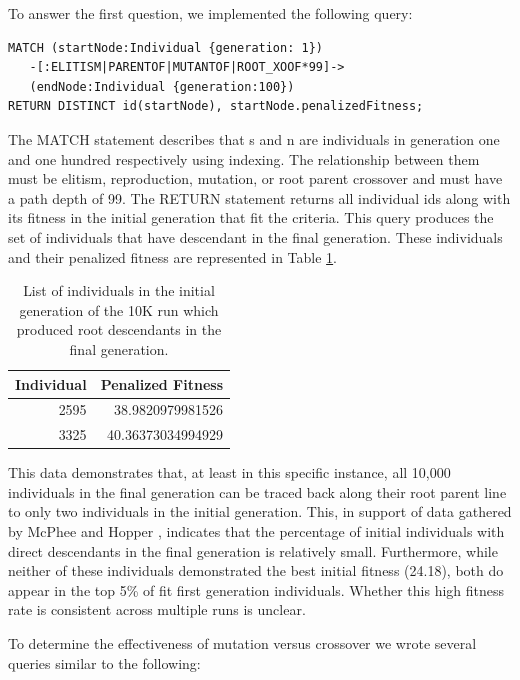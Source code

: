 \documentclass[12pt]{article}
\begin{document}
To answer the first question, we implemented the following query:

\begin{verbatim}
MATCH (startNode:Individual {generation: 1})
   -[:ELITISM|PARENTOF|MUTANTOF|ROOT_XOOF*99]->
   (endNode:Individual {generation:100})
RETURN DISTINCT id(startNode), startNode.penalizedFitness;
\end{verbatim}

The MATCH statement describes that s and n are individuals in generation one and one hundred respectively using indexing. The relationship between them must be elitism, reproduction, mutation, or root parent crossover and must have a path depth of 99. The RETURN statement returns all individual ids along with its fitness in the initial generation that fit the criteria. This query produces the set of individuals that have descendant in the final generation. These individuals and their penalized fitness are represented in Table \ref{tab:descendantsTable}.
\begin{table}[tb]
\begin{center}
\begin{tabular}{|r|r|}
    \hline
    \textbf{Individual} & \textbf{Penalized Fitness} \\ \hline
    2595 & 38.9820979981526 \\
    3325 & 40.36373034994929 \\
    \hline
\end{tabular}
\caption{List of individuals in the initial generation of the 10K run which produced root descendants in the final generation.}
\label{tab:descendantsTable}
\end{center}
\end{table}

This data demonstrates that, at least in this specific instance, all 10,000 individuals in the final generation can be traced back along their root parent line to only two individuals in the initial generation. This, in support of data gathered by McPhee and Hopper \cite{mcphee1999analysis}, indicates that the percentage of initial individuals with direct descendants in the final generation is relatively small. Furthermore, while neither of these individuals demonstrated the best initial fitness (24.18), both do appear in the top 5\% of fit first generation individuals. Whether this high fitness rate is consistent across multiple runs is unclear.

To determine the effectiveness of mutation versus crossover we wrote several queries similar to the following:
\end{document}

